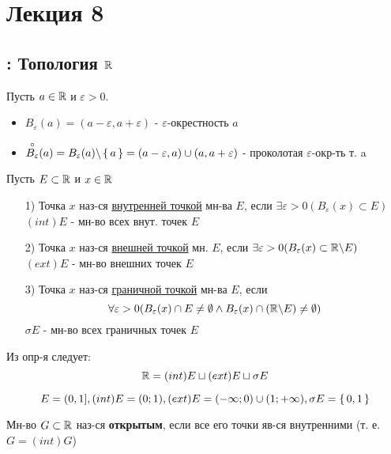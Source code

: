 \section{Лекция 8}

\subsection{: Топология $\mathbb{R}$}
Пусть $a \in \mathbb{R}$ и $\varepsilon > 0$.
\begin{symb}
  \begin{itemize}
    \item
$B_{\varepsilon}(a) = (a - \varepsilon, a + \varepsilon)$ - $\varepsilon$-окрестность $a$
  \item
    $\overset{\circ}{B_{\varepsilon}}(a) = B_{\varepsilon}(a) \backslash \set{a} = (a - \varepsilon, a) \cup (a, a + \varepsilon)$ - проколотая $\varepsilon$-окр-ть т. a
  \end{itemize}
\end{symb}
\begin{definition}
Пусть $E \subset \mathbb{R}$ и $x \in \mathbb{R}$
\begin{itemize}
  \item [1) ] Точка $x$ наз-ся \underline{внутренней точкой} мн-ва $E$, если $\exists \varepsilon > 0 (B_{\varepsilon}(x) \subset E)$ \\

    $(int) E$ - мн-во всех внут. точек $E$
  \item [2) ] Точка $x$ наз-ся \underline{внешней точкой} мн. $E$, если $\exists \varepsilon > 0 (B_{\varepsilon}(x) \subset \mathbb{R} \backslash E)$
    $(ext) E$ - мн-во внешних точек $E$
  \item [3) ] Точка $x$ наз-ся \underline{граничной точкой} мн-ва $E$, если
    \[
      \forall \varepsilon > 0 (B_{\varepsilon}(x) \cap E \neq \emptyset \land B_{\varepsilon}(x) \cap (\mathbb{R} \backslash E) \neq \emptyset)
    \]
    $\sigma E$ - мн-во всех граничных точек $E$
\end{itemize}
\end{definition}
\begin{note}
Из опр-я следует:
\[
\mathbb{R} = (int) E \sqcup (ext) E \sqcup \sigma E
\]
\end{note}
\begin{example}
  \[
    E = (0, 1], (int) E = (0; 1), (ext) E = (-\infty; 0) \cup (1; +\infty), \sigma E = \set{0, 1}
  \]
\end{example}
\begin{definition}
Мн-во $G \subset \mathbb{R}$ наз-ся \textbf{открытым}, если все его точки яв-ся внутренними (т. е. $G = (int) G$)
\end{definition}
